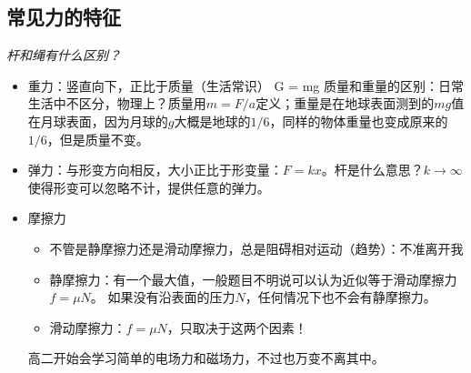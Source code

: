 \documentclass[a4paper,9pt]{ctexart}
\begin{document}
\subsection{常见力的特征}
\emph{杆和绳有什么区别？}
\begin{itemize}
\item
重力：竖直向下，正比于质量（生活常识）
\beq
G = mg
\eeq
质量和重量的区别：日常生活中不区分，物理上？\so 质量用$m = F/a$定义；重量是在地球表面测到的$mg$值 \so 在月球表面，因为月球的$g$大概是地球的$1/6$，同样的物体重量也变成原来的$1/6$，但是质量不变。
\item
弹力：与形变方向相反，大小正比于形变量：$F = kx$。\so {}杆是什么意思？$k \to \infty$使得形变可以忽略不计，提供任意的弹力。
\item
摩擦力
\begin{itemize}
\item
不管是静摩擦力还是滑动摩擦力，总是阻碍相对运动（趋势）：不准离开我
\item
静摩擦力：有一个最大值，一般题目不明说可以认为近似等于滑动摩擦力$f = \mu N$。 \so 如果没有沿表面的压力$N$，任何情况下也不会有静摩擦力。
\item
滑动摩擦力：$f = \mu N$，只取决于这两个因素！
\end{itemize}
高二开始会学习简单的电场力和磁场力，不过也万变不离其中。
\end{itemize}
\end{document}
